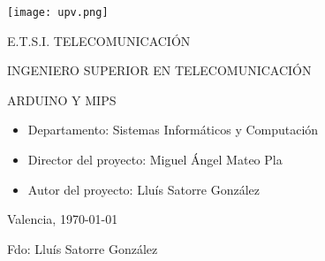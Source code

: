 

\begin{center}

  \texttt{[image: upv.png]} \\

  \vspace{2.0cm}

  \Large{E.T.S.I. TELECOMUNICACIÓN} \\

  \vspace{1.0cm}

  \large{INGENIERO SUPERIOR EN TELECOMUNICACIÓN} \\

  \vspace{2.0cm}

  \large{ARDUINO Y MIPS} \\

  \vspace{1.0cm}

\end{center}

\begin{itemize}
\item \large{Departamento: Sistemas Informáticos y Computación}
\item \large{Director del proyecto: Miguel Ángel Mateo Pla}
\item \large{Autor del proyecto: Lluís Satorre González}
\end{itemize}

\vspace{1.0cm}

\begin{flushright}
  \large{Valencia, \today} \\

  \vspace{2.5cm}

  \large{Fdo: Lluís Satorre González}
\end{flushright}
